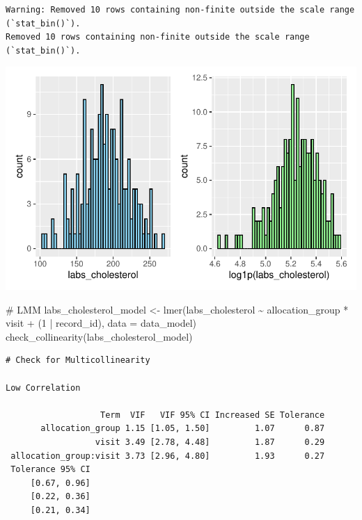 \documentclass[
  letterpaper,
  DIV=11,
  numbers=noendperiod]{scrartcl}
\newenvironment{Shaded}{\begin{snugshade}}{\end{snugshade}}
\newcommand{\AttributeTok}[1]{\textcolor[rgb]{0.40,0.45,0.13}{#1}}
\newcommand{\CommentTok}[1]{\textcolor[rgb]{0.37,0.37,0.37}{#1}}
\newcommand{\DecValTok}[1]{\textcolor[rgb]{0.68,0.00,0.00}{#1}}
\newcommand{\FunctionTok}[1]{\textcolor[rgb]{0.28,0.35,0.67}{#1}}
\newcommand{\NormalTok}[1]{\textcolor[rgb]{0.00,0.23,0.31}{#1}}
\newcommand{\OtherTok}[1]{\textcolor[rgb]{0.00,0.23,0.31}{#1}}
\newcommand{\SpecialCharTok}[1]{\textcolor[rgb]{0.37,0.37,0.37}{#1}}
\begin{document}
\begin{verbatim}
Warning: Removed 10 rows containing non-finite outside the scale range (`stat_bin()`).
Removed 10 rows containing non-finite outside the scale range (`stat_bin()`).
\end{verbatim}

\includegraphics{Outcomes_V1V2V3_files/figure-pdf/labs_cholesterol_1-1.pdf}

\begin{Shaded}
\begin{Highlighting}[]
\CommentTok{\# LMM}
\NormalTok{labs\_cholesterol\_model }\OtherTok{\textless{}{-}} \FunctionTok{lmer}\NormalTok{(labs\_cholesterol }\SpecialCharTok{\textasciitilde{}}\NormalTok{ allocation\_group }\SpecialCharTok{*}\NormalTok{ visit }\SpecialCharTok{+}\NormalTok{ (}\DecValTok{1} \SpecialCharTok{|}\NormalTok{ record\_id), }\AttributeTok{data =}\NormalTok{ data\_model)}
\FunctionTok{check\_collinearity}\NormalTok{(labs\_cholesterol\_model)}
\end{Highlighting}
\end{Shaded}

\begin{verbatim}
# Check for Multicollinearity

Low Correlation

                   Term  VIF   VIF 95% CI Increased SE Tolerance
       allocation_group 1.15 [1.05, 1.50]         1.07      0.87
                  visit 3.49 [2.78, 4.48]         1.87      0.29
 allocation_group:visit 3.73 [2.96, 4.80]         1.93      0.27
 Tolerance 95% CI
     [0.67, 0.96]
     [0.22, 0.36]
     [0.21, 0.34]
\end{verbatim}
\end{document}
